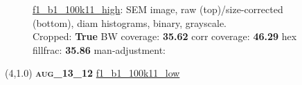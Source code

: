 \begin{figure}[h!]
\label{semimg0}
\caption*{\hyperlink{covtableaug_13_12}{\color{blue} \small \ttfamily f1\_b1\_100k11\_high}: SEM image, raw (top)/size-corrected (bottom), diam histograms, binary, grayscale.\\Cropped: {\bf True} \;\; BW coverage: {\bf 35.62} \:\: corr coverage: {\bf 46.29} \:\: hex fillfrac: {\bf 35.86} \:\: man-adjustment: {\bf \color{blue}{Yes}}}
\end{figure}
\newpage

\begin{textblock}{5}(4,1.0)
{\bf \textsc{aug\_13\_12}}
\hspace{4.5cm}
\hyperlink{covtableaug_13_12}{\color{blue} \large \ttfamily f1\_b1\_100k11\_low}
\end{textblock}

